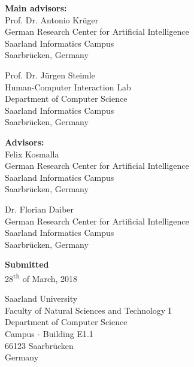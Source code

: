 \pagestyle{empty}

\vspace*{0.5cm}
\textbf{Main advisors:}\\
Prof. Dr. Antonio Krüger\\
German Research Center for Artificial Intelligence\\
Saarland Informatics Campus\\
Saarbrücken, Germany

\vspace*{0.5cm}
Prof. Dr. Jürgen Steimle\\
Human-Computer Interaction Lab\\
Department of Computer Science\\
Saarland Informatics Campus\\
Saarbrücken, Germany

\vspace*{1.5cm}
\textbf{Advisors:}\\
Felix Kosmalla\\
German Research Center for Artificial Intelligence\\
Saarland Informatics Campus\\
Saarbrücken, Germany

\vspace*{0.5cm}
Dr. Florian Daiber\\
German Research Center for Artificial Intelligence\\
Saarland Informatics Campus\\
Saarbrücken, Germany


\vspace{2cm}
\textbf{Submitted}\\
28\textsuperscript{th} of March, 2018

\vspace{1cm}
Saarland University\\
Faculty of Natural Sciences and Technology I\\
Department of Computer Science\\
Campus - Building E1.1\\
66123 Saarbrücken\\
Germany\\


